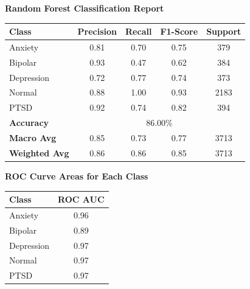 \begin{center}
    \textbf{Random Forest Classification Report} \\[0.5em]
    \begin{tabular}{|l|c|c|c|c|}
        \hline
        \textbf{Class} & \textbf{Precision} & \textbf{Recall} & \textbf{F1-Score} & \textbf{Support} \\ \hline
        Anxiety        & 0.81               & 0.70            & 0.75              & 379              \\ \hline
        Bipolar        & 0.93               & 0.47            & 0.62              & 384              \\ \hline
        Depression     & 0.72               & 0.77            & 0.74              & 373              \\ \hline
        Normal         & 0.88               & 1.00            & 0.93              & 2183             \\ \hline
        PTSD           & 0.92               & 0.74            & 0.82              & 394              \\ \hline
        \textbf{Accuracy} & \multicolumn{4}{|c|}{86.00\%} \\ \hline
        \textbf{Macro Avg} & 0.85            & 0.73            & 0.77              & 3713             \\ \hline
        \textbf{Weighted Avg} & 0.86         & 0.86            & 0.85              & 3713             \\ \hline
    \end{tabular}
\end{center}

\vspace{0.25em}

\begin{center}
    \textbf{ROC Curve Areas for Each Class} \\[0.5em]
    \begin{tabular}{|l|c|}
        \hline
        \textbf{Class}  & \textbf{ROC AUC} \\ \hline
        Anxiety         & 0.96            \\ \hline
        Bipolar         & 0.89            \\ \hline
        Depression      & 0.97            \\ \hline
        Normal          & 0.97            \\ \hline
        PTSD            & 0.97            \\ \hline
    \end{tabular}
\end{center}

